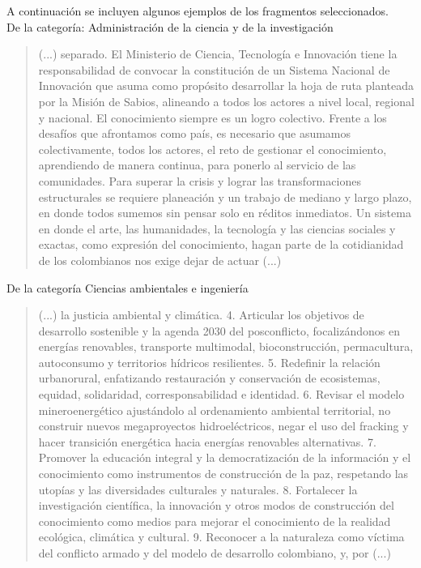 \documentclass[11pt,a4paper]{article}
\begin{document}
	 
	
	A  continuación se incluyen algunos ejemplos de los fragmentos seleccionados. \\
	 
	
	De la categoría: Administración de la ciencia y de la investigación
	
	\begin{quote}
		(...) separado. El Ministerio de Ciencia, Tecnología e Innovación tiene la responsabilidad de convocar la constitución de un Sistema Nacional de Innovación que asuma como propósito desarrollar la hoja de ruta planteada por la Misión de Sabios, alineando a todos los actores a nivel local, regional y nacional. El conocimiento siempre es un logro colectivo. Frente a los desafíos que afrontamos como país, es necesario que asumamos colectivamente, todos los actores, el reto de gestionar el conocimiento, aprendiendo de manera continua, para ponerlo al servicio de las comunidades. Para superar la crisis y lograr las transformaciones estructurales se requiere planeación y un trabajo de mediano y largo plazo, en donde todos sumemos sin pensar solo en réditos inmediatos. Un sistema en donde el arte, las humanidades, la tecnología y las ciencias sociales y exactas, como expresión del conocimiento, hagan parte de la cotidianidad de los colombianos nos exige dejar de actuar (...)
	\end{quote}
	
	De la categoría Ciencias ambientales e ingeniería
	
	\begin{quote}
		(...) la justicia ambiental y climática. 4. Articular los objetivos de desarrollo sostenible y la agenda 2030 del posconflicto, focalizándonos en energías renovables, transporte multimodal, bioconstrucción, permacultura, autoconsumo y territorios hídricos resilientes. 5. Redefinir la relación urbanorural, enfatizando restauración y conservación de ecosistemas, equidad, solidaridad, corresponsabilidad e identidad. 6. Revisar el modelo mineroenergético ajustándolo al ordenamiento ambiental territorial, no construir nuevos megaproyectos hidroeléctricos, negar el uso del fracking y hacer transición energética hacia energías renovables alternativas. 7. Promover la educación integral y la democratización de la información y el conocimiento como instrumentos de construcción de la paz, respetando las utopías y las diversidades culturales y naturales. 8. Fortalecer la investigación científica, la innovación y otros modos de construcción del conocimiento como medios para mejorar el conocimiento de la realidad ecológica, climática y cultural. 9. Reconocer a la naturaleza como víctima del conflicto armado y del modelo de desarrollo colombiano, y, por (...)
	\end{quote}
	
\end{document}
